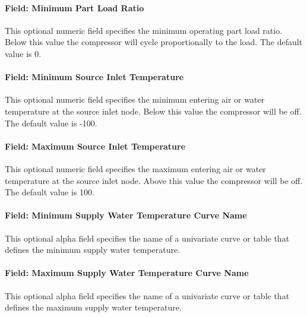 \paragraph{Field: Minimum Part Load Ratio}\label{plhp_eir_heating_inputs_minimum_part_load_ratio}

This optional numeric field specifies the minimum operating part load ratio. Below this value the compressor will cycle proportionally to the load. The default value is 0.

\paragraph{Field: Minimum Source Inlet Temperature}\label{plhp_eir_heating_inputs_minimum_source_inlet_temperature}

This optional numeric field specifies the minimum entering air or water temperature at the source inlet node. Below this value the compressor will be off. The default value is -100.

\paragraph{Field: Maximum Source Inlet Temperature}\label{plhp_eir_heating_inputs_maximum_source_inlet_temperature}

This optional numeric field specifies the maximum entering air or water temperature at the source inlet node. Above this value the compressor will be off. The default value is 100.

\paragraph{Field: Minimum Supply Water Temperature Curve Name}\label{plhp_eir_heating_inputs_minimum_supply_water_temperature_curve_name}

This optional alpha field specifies the name of a univariate curve or table that defines the minimum supply water temperature.

\paragraph{Field: Maximum Supply Water Temperature Curve Name}\label{plhp_eir_heating_inputs_maximum_supply_water_temperature_curve_name}

This optional alpha field specifies the name of a univariate curve or table that defines the maximum supply water temperature.


